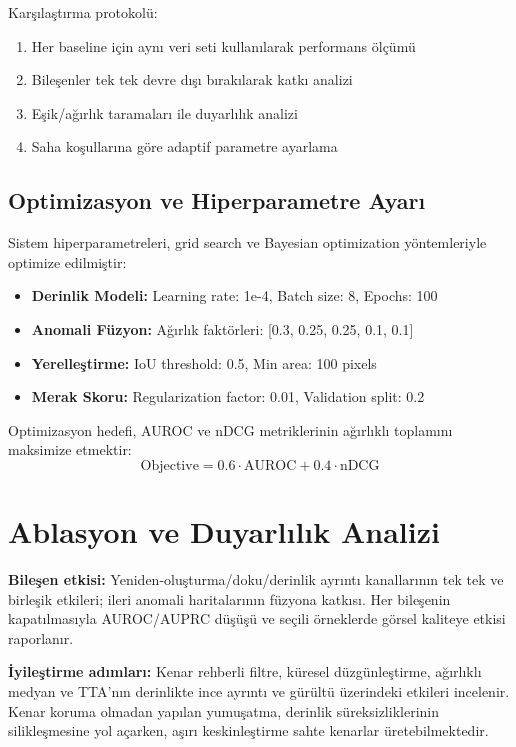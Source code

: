\documentclass[12pt]{article}
\begin{document}
Karşılaştırma protokolü:
\begin{enumerate}
\item Her baseline için aynı veri seti kullanılarak performans ölçümü
\item Bileşenler tek tek devre dışı bırakılarak katkı analizi
\item Eşik/ağırlık taramaları ile duyarlılık analizi
\item Saha koşullarına göre adaptif parametre ayarlama
\end{enumerate}

\subsection{Optimizasyon ve Hiperparametre Ayarı}
Sistem hiperparametreleri, grid search ve Bayesian optimization yöntemleriyle optimize edilmiştir:

\begin{itemize}
\item \textbf{Derinlik Modeli:} Learning rate: 1e-4, Batch size: 8, Epochs: 100
\item \textbf{Anomali Füzyon:} Ağırlık faktörleri: [0.3, 0.25, 0.25, 0.1, 0.1]
\item \textbf{Yerelleştirme:} IoU threshold: 0.5, Min area: 100 pixels
\item \textbf{Merak Skoru:} Regularization factor: 0.01, Validation split: 0.2
\end{itemize}

Optimizasyon hedefi, AUROC ve nDCG metriklerinin ağırlıklı toplamını maksimize etmektir:
\[ \text{Objective} = 0.6 \cdot \text{AUROC} + 0.4 \cdot \text{nDCG} \]

\section{Ablasyon ve Duyarlılık Analizi}
\textbf{Bileşen etkisi:} Yeniden-oluşturma/doku/derinlik ayrıntı kanallarının tek tek ve birleşik etkileri; ileri anomali haritalarının füzyona katkısı. Her bileşenin kapatılmasıyla AUROC/AUPRC düşüşü ve seçili örneklerde görsel kaliteye etkisi raporlanır.

\textbf{İyileştirme adımları:} Kenar rehberli filtre, küresel düzgünleştirme, ağırlıklı medyan ve TTA'nın derinlikte ince ayrıntı ve gürültü üzerindeki etkileri incelenir. Kenar koruma olmadan yapılan yumuşatma, derinlik süreksizliklerinin silikleşmesine yol açarken, aşırı keskinleştirme sahte kenarlar üretebilmektedir.
\end{document}
